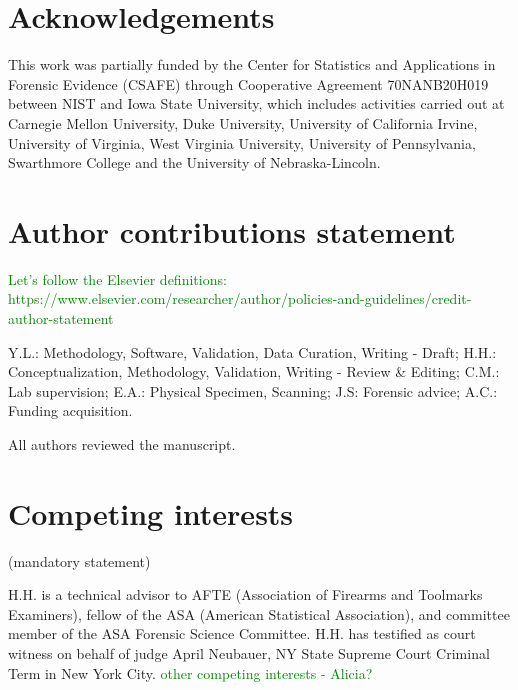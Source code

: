 \documentclass[fleqn,10pt]{wlscirep}
\newcommand{\hh}[1]{{\textcolor{Green}{#1}}}
\begin{document}
\section*{Acknowledgements} 
This work was partially funded by the Center for Statistics and
Applications in Forensic Evidence (CSAFE) through Cooperative Agreement
70NANB20H019 between NIST and Iowa State University, which includes
activities carried out at Carnegie Mellon University, Duke University,
University of California Irvine, University of Virginia, West Virginia
University, University of Pennsylvania, Swarthmore College and the
University of Nebraska-Lincoln.

\section*{Author contributions statement}

\hh{Let's follow the Elsevier definitions: https://www.elsevier.com/researcher/author/policies-and-guidelines/credit-author-statement}

Y.L.: Methodology, Software, Validation, Data Curation, Writing - Draft;
H.H.: Conceptualization, Methodology, Validation, Writing - Review \&
Editing; C.M.: Lab supervision; E.A.: Physical Specimen, Scanning; J.S:
Forensic advice; A.C.: Funding acquisition.

\noindent
All authors reviewed the manuscript. 

\section*{Competing interests} (mandatory statement)

H.H. is a technical advisor to AFTE (Association of Firearms and
Toolmarks Examiners), fellow of the ASA (American Statistical
Association), and committee member of the ASA Forensic Science
Committee. H.H. has testified as court witness on behalf of judge April
Neubauer, NY State Supreme Court Criminal Term in New York City.
\hh{other competing interests - Alicia?}
\end{document}
